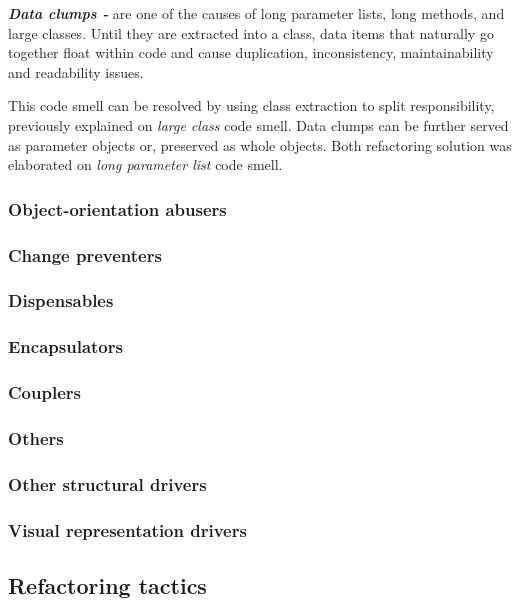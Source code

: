 \textit{\textbf{Data clumps -}} are one of the causes of long parameter lists, long methods, and large classes. Until they are extracted into a class, data items that naturally go together float within code and cause duplication, inconsistency, maintainability and readability issues.

This code smell can be resolved by using class extraction to split responsibility, previously explained on \textit{large class} code smell. Data clumps can be further served as parameter objects or, preserved as whole objects. Both refactoring solution was elaborated on \textit{long parameter list} code smell.

\subsubsection*{Object-orientation abusers}

\subsubsection*{Change preventers}

\subsubsection*{Dispensables}

\subsubsection*{Encapsulators}

\subsubsection*{Couplers}

\subsubsection*{Others}

\subsubsection{Other structural drivers}

\subsubsection{Visual representation drivers}
 

\subsection{Refactoring tactics}